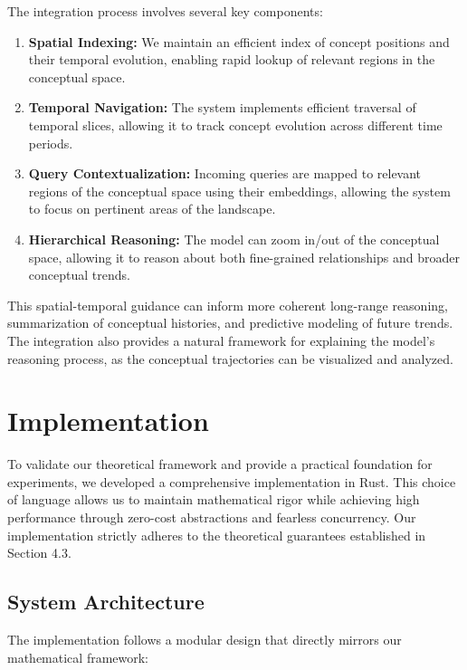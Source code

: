 \documentclass{article}
\begin{document}
The integration process involves several key components:

\begin{enumerate}
    \item \textbf{Spatial Indexing:} We maintain an efficient index of concept positions and their temporal evolution, enabling rapid lookup of relevant regions in the conceptual space.
    
    \item \textbf{Temporal Navigation:} The system implements efficient traversal of temporal slices, allowing it to track concept evolution across different time periods.
    
    \item \textbf{Query Contextualization:} Incoming queries are mapped to relevant regions of the conceptual space using their embeddings, allowing the system to focus on pertinent areas of the landscape.
    
    \item \textbf{Hierarchical Reasoning:} The model can zoom in/out of the conceptual space, allowing it to reason about both fine-grained relationships and broader conceptual trends.
\end{enumerate}

This spatial-temporal guidance can inform more coherent long-range reasoning, summarization of conceptual histories, and predictive modeling of future trends. The integration also provides a natural framework for explaining the model's reasoning process, as the conceptual trajectories can be visualized and analyzed.


\section{Implementation}
To validate our theoretical framework and provide a practical foundation for experiments, we developed a comprehensive implementation in Rust. This choice of language allows us to maintain mathematical rigor while achieving high performance through zero-cost abstractions and fearless concurrency. Our implementation strictly adheres to the theoretical guarantees established in Section 4.3.

\subsection{System Architecture}
The implementation follows a modular design that directly mirrors our mathematical framework:
\end{document}
